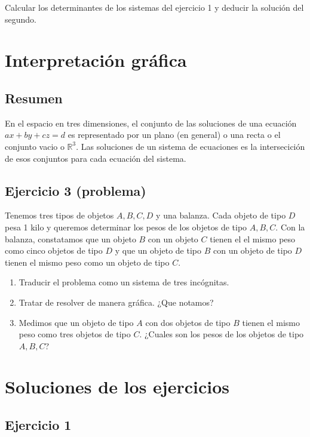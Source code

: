Calcular los determinantes de los sistemas del ejercicio 1 y deducir la
solución del segundo.

\section{Interpretación gráfica}

\subsection*{Resumen}

En el espacio en tres dimensiones, el conjunto de las soluciones de una ecuación
$ax + by + cz = d$ es representado por un plano (en general) o una recta o
el conjunto vacio o ${\mathbb R}^3$. Las soluciones de un sistema de ecuaciones
es la intersecición de esos conjuntos para cada ecuación del sistema.

\subsection*{Ejercicio 3 (problema)}

Tenemos tres tipos de objetos $A, B, C, D$ y una balanza. Cada objeto de tipo
$D$ pesa 1 kilo y queremos determinar los pesos de los objetos de tipo
$A, B, C$. Con la balanza, constatamos que un objeto
$B$ con un objeto $C$ tienen el el mismo peso como cinco objetos de tipo $D$ y
que un objeto de tipo $B$ con un objeto de tipo $D$ tienen el mismo peso como
un objeto de tipo $C$.

\begin{enumerate}
\item Traducir el problema como un sistema de tres incógnitas.
\item Tratar de resolver de manera gráfica. ¿Que notamos?
\item Medimos que un objeto de tipo $A$ con dos objetos de tipo $B$ tienen el
  mismo peso como tres objetos de tipo $C$. ¿Cuales son los pesos de los
  objetos de tipo $A, B, C$?
\end{enumerate}

\section{Soluciones de los ejercicios}

\subsection*{Ejercicio 1}

